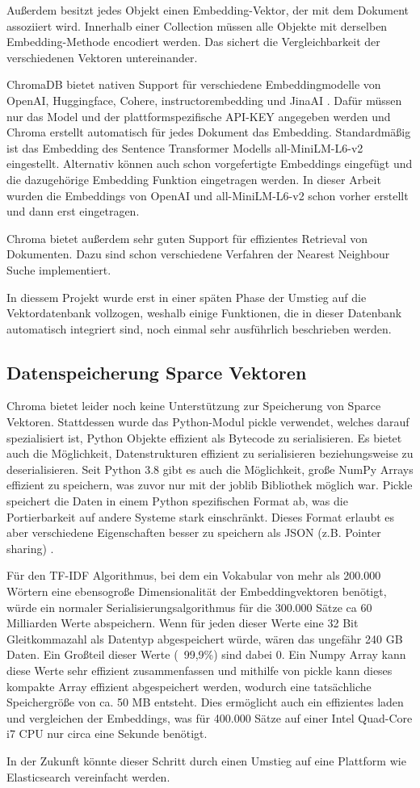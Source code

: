 Außerdem besitzt jedes Objekt einen Embedding-Vektor, der mit dem Dokument assoziiert wird. 
Innerhalb einer Collection müssen alle Objekte mit derselben Embedding-Methode encodiert werden.
Das sichert die Vergleichbarkeit der verschiedenen Vektoren untereinander.

ChromaDB bietet nativen Support für verschiedene Embeddingmodelle von OpenAI, Huggingface, Cohere, instructorembedding und JinaAI \cite{chroma}.
Dafür müssen nur das Model und der plattformspezifische API-KEY angegeben werden und Chroma erstellt automatisch für jedes Dokument das Embedding.
Standardmäßig ist das Embedding des Sentence Transformer Modells all-MiniLM-L6-v2 eingestellt.
Alternativ können auch schon vorgefertigte Embeddings eingefügt und die dazugehörige Embedding Funktion eingetragen werden.
In dieser Arbeit wurden die Embeddings von OpenAI und all-MiniLM-L6-v2 schon vorher erstellt und dann erst eingetragen.

Chroma bietet außerdem sehr guten Support für effizientes Retrieval von Dokumenten.
Dazu sind schon verschiedene Verfahren der Nearest Neighbour Suche implementiert.

In diessem Projekt wurde erst in einer späten Phase der Umstieg auf die Vektordatenbank vollzogen, weshalb einige Funktionen, die in dieser Datenbank automatisch integriert sind, noch einmal sehr ausführlich beschrieben werden.


\subsection{Datenspeicherung Sparce Vektoren}

Chroma bietet leider noch keine Unterstützung zur Speicherung von Sparce Vektoren.
Stattdessen wurde das Python-Modul pickle verwendet, welches darauf spezialisiert ist, Python Objekte effizient als Bytecode zu serialisieren. 
Es bietet auch die Möglichkeit, Datenstrukturen effizient zu serialisieren beziehungsweise zu deserialisieren.
Seit Python 3.8 gibt es auch die Möglichkeit, große NumPy Arrays effizient zu speichern, was zuvor nur mit der joblib Bibliothek möglich war.
Pickle speichert die Daten in einem Python spezifischen Format ab, was die Portierbarkeit auf andere Systeme stark einschränkt. 
Dieses Format erlaubt es aber verschiedene Eigenschaften besser zu speichern als JSON (z.B. Pointer sharing) \cite{pickle}.

Für den TF-IDF Algorithmus, bei dem ein Vokabular von mehr als 200.000 Wörtern eine ebensogroße Dimensionalität der Embeddingvektoren benötigt, würde ein normaler Serialisierungsalgorithmus für die 300.000 Sätze ca 60 Milliarden Werte abspeichern.
Wenn für jeden dieser Werte eine 32 Bit Gleitkommazahl als Datentyp abgespeichert würde, wären das ungefähr 240 GB Daten. 
Ein Großteil dieser Werte (~99,9\%) sind dabei 0.
Ein Numpy Array kann diese Werte sehr effizient zusammenfassen und mithilfe von pickle kann dieses kompakte Array effizient abgespeichert werden, wodurch eine tatsächliche Speichergröße von ca. 50 MB entsteht.
Dies ermöglicht auch ein effizientes laden und vergleichen der Embeddings, was für 400.000 Sätze auf einer Intel Quad-Core i7 CPU nur circa eine Sekunde benötigt.

In der Zukunft könnte dieser Schritt durch einen Umstieg auf eine Plattform wie Elasticsearch vereinfacht werden.




